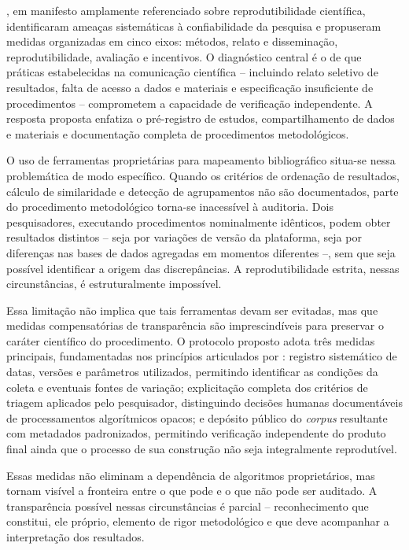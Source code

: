 \documentclass[portuguese]{textolivre}
\begin{document}
	\textcite{Munafo2017}, em manifesto amplamente referenciado sobre reprodutibilidade científica, identificaram ameaças sistemáticas à confiabilidade da pesquisa e propuseram medidas organizadas em cinco eixos: métodos, relato e disseminação, reprodutibilidade, avaliação e incentivos. O diagnóstico central é o de que práticas estabelecidas na comunicação científica – incluindo relato seletivo de resultados, falta de acesso a dados e materiais e especificação insuficiente de procedimentos – comprometem a capacidade de verificação independente. A resposta proposta enfatiza o pré-registro de estudos, compartilhamento de dados e materiais e documentação completa de procedimentos metodológicos.
    
	O uso de ferramentas proprietárias para mapeamento bibliográfico situa-se nessa problemática de modo específico. Quando os critérios de ordenação de resultados, cálculo de similaridade e detecção de agrupamentos não são documentados, parte do procedimento metodológico torna-se inacessível à auditoria. Dois pesquisadores, executando procedimentos nominalmente idênticos, podem obter resultados distintos – seja por variações de versão da plataforma, seja por diferenças nas bases de dados agregadas em momentos diferentes –, sem que seja possível identificar a origem das discrepâncias. A reprodutibilidade estrita, nessas circunstâncias, é estruturalmente impossível.
    
	Essa limitação não implica que tais ferramentas devam ser evitadas, mas que medidas compensatórias de transparência são imprescindíveis para preservar o caráter científico do procedimento. O protocolo proposto adota três medidas principais, fundamentadas nos princípios articulados por \textcite{Munafo2017}: registro sistemático de datas, versões e parâmetros utilizados, permitindo identificar as condições da coleta e eventuais fontes de variação; explicitação completa dos critérios de triagem aplicados pelo pesquisador, distinguindo decisões humanas documentáveis de processamentos algorítmicos opacos; e depósito público do \textit{corpus} resultante com metadados padronizados, permitindo verificação independente do produto final ainda que o processo de sua construção não seja integralmente reprodutível.
    
	Essas medidas não eliminam a dependência de algoritmos proprietários, mas tornam visível a fronteira entre o que pode e o que não pode ser auditado. A transparência possível nessas circunstâncias é parcial – reconhecimento que constitui, ele próprio, elemento de rigor metodológico e que deve acompanhar a interpretação dos resultados.
\end{document}
